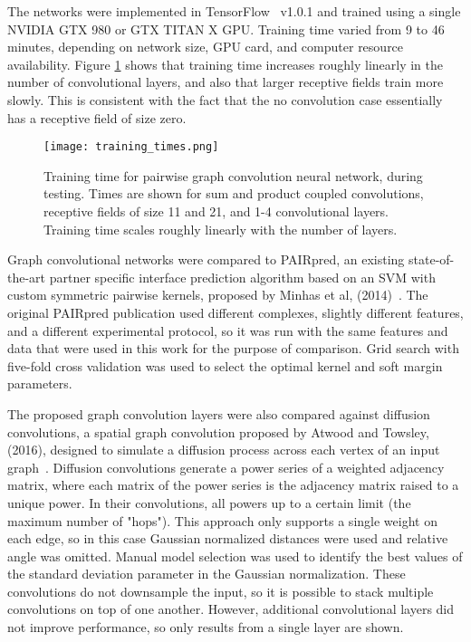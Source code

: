 The networks were implemented in TensorFlow~\cite{abadi2015} v1.0.1 and trained using a single NVIDIA GTX 980 or GTX TITAN X GPU.
Training time varied from 9 to 46 minutes, depending on network size, GPU card, and computer resource availability.
Figure \ref{fig:train_times} shows that training time increases roughly linearly in the number of convolutional layers, and also that larger receptive fields train more slowly.
This is consistent with the fact that the no convolution case essentially has a receptive field of size zero.

\begin{figure}
	\texttt{[image: training\_times.png]}
	\caption{Training time for pairwise graph convolution neural network, during testing. Times are shown for sum and product coupled convolutions, receptive fields of size 11 and 21, and 1-4 convolutional layers. Training time scales roughly linearly with the number of layers.
	\label{fig:train_times}}
\end{figure}

Graph convolutional networks were compared to PAIRpred, an existing state-of-the-art partner specific interface prediction algorithm based on an SVM with custom symmetric pairwise kernels, proposed by Minhas et al, (2014)~\cite{minhas2014}.
The original PAIRpred publication used different complexes, slightly different features, and a different experimental protocol, so it was run with the same features and data that were used in this work for the purpose of comparison.
Grid search with five-fold cross validation was used to select the optimal kernel and soft margin parameters.

The proposed graph convolution layers were also compared against diffusion convolutions, a spatial graph convolution proposed by Atwood and Towsley, (2016), designed to simulate a diffusion process across each vertex of an input graph~\cite{atwood2016}.
Diffusion convolutions generate a power series of a weighted adjacency matrix, where each matrix of the power series is the adjacency matrix raised to a unique power.
In their convolutions, all powers up to a certain limit (the maximum number of "hops").
This approach only supports a single weight on each edge, so in this case Gaussian normalized distances were used and relative angle was omitted.
Manual model selection was used to identify the best values of the standard deviation parameter in the Gaussian normalization.
These convolutions do not downsample the input, so it is possible to stack multiple convolutions on top of one another.
However, additional convolutional layers did not improve performance, so only results from a single layer are shown. 

